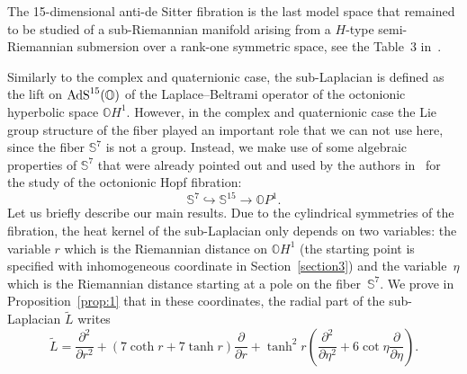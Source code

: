 \documentclass[pdftex]{sigma}
\numberwithin{equation}{section}
\begin{document}
The 15-dimensional anti-de Sitter fibration is the last model space that remained to be studied of a sub-Riemannian manifold arising from a $H$-type semi-Riemannian submersion over a rank-one symmetric space, see the Table~3 in~\cite{BGMR}.

Similarly to the complex and quaternionic case, the sub-Laplacian is defined as the lift on ${\rm AdS}^{15}(\mathbb{O})$ of the Laplace--Beltrami operator of the octonionic hyperbolic space $\mathbb{O}H^1$. However, in the complex and quaternionic case the Lie group structure of the fiber played an important role that we can not use here, since the fiber $\mathbb{S}^7$ is not a group. Instead, we make use of some algebraic properties of $\mathbb S^7$ that were already pointed out and used by the authors in~\cite{FBGC19} for the study of the octonionic Hopf fibration:
\begin{equation*}
\mathbb{S}^7 \hookrightarrow \mathbb{S}^{15} \rightarrow \mathbb{O}P^1.
\end{equation*}
Let us briefly describe our main results. Due to the cylindrical symmetries of the fibration, the heat kernel of the sub-Laplacian only depends on two variables: the variable $r$ which is the Riemannian distance on $\mathbb{O}H^1$ (the starting point is specified with inhomogeneous coordinate in Section~\ref{section3}) and the variable~$\eta$ which is the Riemannian distance starting at a pole on the fiber~$\mathbb{S}^7$. We prove in Proposition~\ref{prop:1} that in these coordinates, the radial part of the sub-Laplacian $\tilde{L}$ writes
\begin{equation*}
\tilde{L}=\frac{{\partial}^2}{\partial {r}^2}+(7\coth r+7\tanh r)\frac{{\partial}}{\partial {r}}+{\tanh^2 r}\left(\frac{{\partial}^2}{\partial {\eta}^2}+6\cot \eta\frac{{\partial}}{\partial {\eta}}\right).
\end{equation*}
\end{document}
